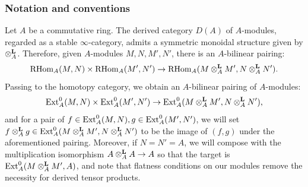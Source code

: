 \subsubsection*{Notation and conventions} Let $A$ be a commutative ring. The derived category $D(A)$ of $A$-modules, regarded as a stable $\infty$-category, admits a symmetric monoidal structure given by $\otimes^{\boldsymbol{\mathrm{L}}}_A$. Therefore, given $A$-modules $M,N,M',N'$, there is an $A$-bilinear pairing:
\[\text{RHom}_A(M,N) \times \text{RHom}_A(M',N') \rightarrow \text{RHom}_A(M \otimes^{\boldsymbol{\mathrm{L}}}_A M', N \otimes^{\boldsymbol{\mathrm{L}}}_A N').\]
Passing to the homotopy category, we obtain an $A$-bilinear pairing of $A$-modules:
\[\operatorname{Ext}^0_A(M,N) \times \operatorname{Ext}^0_A(M',N') \rightarrow \operatorname{Ext}^0_A(M \otimes^{\boldsymbol{\mathrm{L}}}_A M', N \otimes^{\boldsymbol{\mathrm{L}}}_A N'),\]
and for a pair of $f \in \operatorname{Ext}^0_A(M,N), g \in \operatorname{Ext}^0_A(M',N')$, we will set 
$f \otimes^{\boldsymbol{\mathrm{L}}}_A g \in \operatorname{Ext}^0_A(M \otimes^{\boldsymbol{\mathrm{L}}}_A M', N \otimes^{\boldsymbol{\mathrm{L}}}_A N')$ to be the image of $(f,g)$ under the aforementioned pairing. 
Moreover, if $N=N'=A$, we will compose with the multiplication isomorphism $A \otimes^{\boldsymbol{\mathrm{L}}}_A A \rightarrow A$ so that the target is 
$\operatorname{Ext}^0_A(M \otimes^{\boldsymbol{\mathrm{L}}}_A M', A)$, and note that flatness conditions on our modules remove the necessity for derived tensor products.
